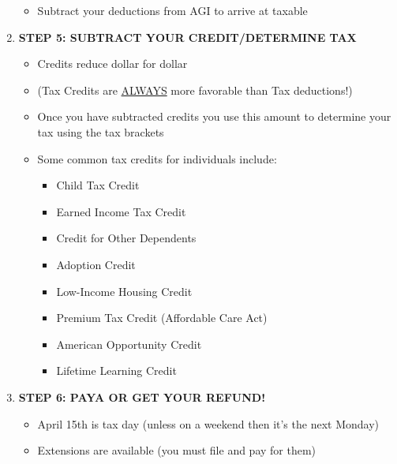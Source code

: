 \documentclass[12pt]{article}
\begin{document}
\begin{enumerate}
                        \begin{itemize}
                            \item Subtract your deductions from AGI to arrive at taxable
                        \end{itemize}
                    \item \textbf{STEP 5: SUBTRACT YOUR CREDIT/DETERMINE TAX}
                        \begin{itemize}
                            \item Credits reduce dollar for dollar
                            \item (Tax Credits are \underline{ALWAYS} more favorable than Tax deductions!)
                            \item Once you have subtracted credits you use this amount to determine your tax using the tax brackets
                            \item Some common tax credits for individuals include:
                                \begin{itemize}
                                    \item Child Tax Credit
                                    \item Earned Income Tax Credit
                                    \item Credit for Other Dependents
                                    \item Adoption Credit
                                    \item Low-Income Housing Credit
                                    \item Premium Tax Credit (Affordable Care Act)
                                    \item American Opportunity Credit
                                    \item Lifetime Learning Credit
                                \end{itemize}
                        \end{itemize}
                    \item \textbf{STEP 6: PAYA OR GET YOUR REFUND!}
                        \begin{itemize}
                            \item April 15th is tax day (unless on a weekend then it's the next Monday)
                            \item Extensions are available (you must file and pay for them)
                        \end{itemize}
                \end{enumerate}
                    
\end{document}
